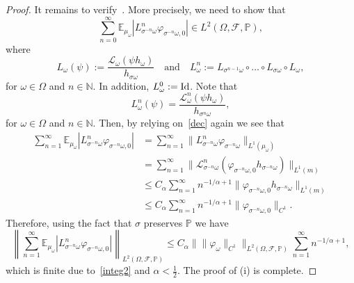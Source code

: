 \documentclass[12pt,reqno,a4paper]{article}
\def\Id{\text{\rm Id}}
\begin{document}
\begin{proof}
		It remains to verify~\cite[Theorem 2.3 (ii')]{K}. More precisely, we need to show that
		\begin{equation}\label{integ3}
			\sum_{n=0}^\infty \mathbb E_{\mu_\omega}  |L_{\sigma^{-n}\omega}^n \varphi_{\sigma^{-n}\omega, 0}| \in L^2(\Omega, \mathcal F, \mathbb P),
		\end{equation}
		where 
		\[
		L_\omega(\psi):=\frac{\mathcal L_\omega (\psi h_\omega)}{h_{\sigma \omega}} \quad \text{and} \quad L_\omega^n:=L_{\sigma^{n-1}\omega} \circ \ldots \circ L_{\sigma \omega}\circ L_\omega,
		\]
		for $\omega \in \Omega$ and $n\in \mathbb N$. In addition, $L_\omega^0:=\Id$.  Note that 
		\[
		L_\omega^n (\psi)=\frac{\mathcal L_\omega^n(\psi h_\omega)}{h_{\sigma^n \omega}},
		\]
		for $\omega \in \Omega$ and $n\in \mathbb N$.
		Then, by relying on~\eqref{dec} again we see that
		\begin{equation}\label{eq:cond_2}
			\begin{split}
				\sum_{n=1}^\infty \mathbb E_{\mu_\omega}  |L_{\sigma^{-n}\omega}^n \varphi_{\sigma^{-n}\omega, 0}| &=\sum_{n=1}^\infty \|L_{\sigma^{-n}\omega}^n \varphi_{\sigma^{-n}\omega}\|_{L^1(\mu_\omega)} \\
				&=\sum_{n=1}^\infty \|\mathcal L_{\sigma^{-n}\omega}^n(\varphi_{\sigma^{-n}\omega, 0}h_{\sigma^{-n}\omega})\|_{L^1(m)} \\
				&\le C_\alpha\sum_{n=1}^\infty n^{-1/\alpha+1}\|\varphi_{\sigma^{-n}\omega, 0}h_{\sigma^{-n}\omega}\|_{L^1(m)} \\
				&\le C_\alpha\sum_{n=1}^\infty n^{-1/\alpha+1}\|\varphi_{\sigma^{-n}\omega, 0}\|_{C^1}.
			\end{split}
		\end{equation}
		Therefore, using the fact that $\sigma$ preserves $\mathbb P$ we have
		\[
		\left \|\sum_{n=1}^\infty \mathbb E_{\mu_\omega } |L_{\sigma^{-n}\omega}^n \varphi_{\sigma^{-n}\omega, 0}| \right \|_{L^2(\Omega, \mathcal F, \mathbb P)}\le C_\alpha \| \|\varphi_{\omega}\|_{C^1}\|_{L^2(\Omega, \mathcal F, \mathbb P)}\sum_{n=1}^\infty n^{-1/\alpha+1},
		\]
		which is finite due to~\eqref{integ2} and $\alpha <\frac 1 2$.  The proof of (i) is complete. \smallskip 
		

\end{proof}
\end{document}
